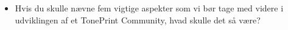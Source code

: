 \begin{itemize}
  \item Hvis du skulle nævne fem vigtige aspekter som vi bør tage med videre i udviklingen af et TonePrint Community, hvad skulle det så være?
\end{itemize}
%
%
%
%
